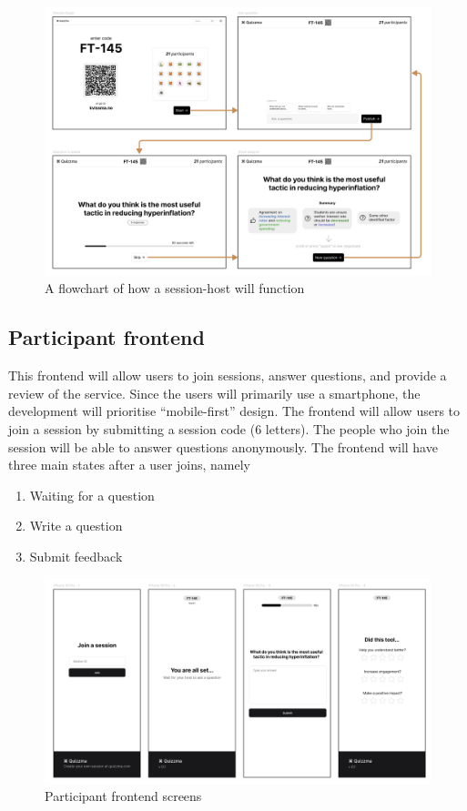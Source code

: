 \begin{figure}[h!]
    \centering
    \includegraphics[width=1\linewidth]{figures//c5/session-frontend.png}
    \caption{A flowchart of how a session-host will function}
    \label{fig:session-host-flowchart}
\end{figure}

\subsection{Participant frontend}
This frontend will allow users to join sessions, answer questions, and provide a review of the service. Since the users will primarily use a smartphone, the development will prioritise ``mobile-first'' design. The frontend will allow users to join a session by submitting a session code (6 letters). The people who join the session will be able to answer questions anonymously. The frontend will have three main states after a user joins, namely 

\begin{enumerate}
    \item Waiting for a question
    \item Write a question
    \item Submit feedback
\end{enumerate}


\begin{figure}[h!]
    \centering
    \includegraphics[width=1\linewidth]{figures//c5/user-frontend.png}
    \caption{Participant frontend screens}
    \label{fig:participant-frontend}
\end{figure}



